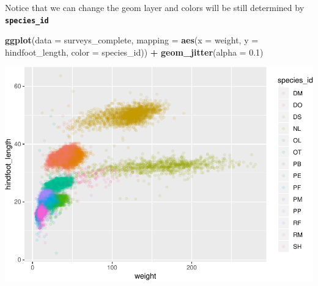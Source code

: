 \documentclass[]{book}
\newenvironment{Shaded}{\begin{snugshade}}{\end{snugshade}}
\newcommand{\KeywordTok}[1]{\textcolor[rgb]{0.13,0.29,0.53}{\textbf{#1}}}
\newcommand{\DataTypeTok}[1]{\textcolor[rgb]{0.13,0.29,0.53}{#1}}
\newcommand{\FloatTok}[1]{\textcolor[rgb]{0.00,0.00,0.81}{#1}}
\newcommand{\StringTok}[1]{\textcolor[rgb]{0.31,0.60,0.02}{#1}}
\newcommand{\OperatorTok}[1]{\textcolor[rgb]{0.81,0.36,0.00}{\textbf{#1}}}
\newcommand{\NormalTok}[1]{#1}
\begin{document}
Notice that we can change the geom layer and colors will be still
determined by \textbf{\texttt{species\_id}}

\begin{Shaded}
\begin{Highlighting}[]
\KeywordTok{ggplot}\NormalTok{(}\DataTypeTok{data =}\NormalTok{ surveys_complete, }\DataTypeTok{mapping =} \KeywordTok{aes}\NormalTok{(}\DataTypeTok{x =}\NormalTok{ weight, }\DataTypeTok{y =}\NormalTok{ hindfoot_length, }\DataTypeTok{color =}\NormalTok{ species_id)) }\OperatorTok{+}
\StringTok{    }\KeywordTok{geom_jitter}\NormalTok{(}\DataTypeTok{alpha =} \FloatTok{0.1}\NormalTok{)}
\end{Highlighting}
\end{Shaded}

\includegraphics{img/R-ecology-color-by-species2-1.pdf}
\end{document}
